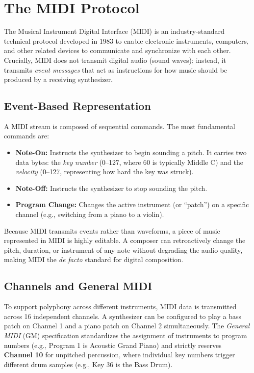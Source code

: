 \section{The MIDI Protocol}\label{sec:background-midi}

The Musical Instrument Digital Interface (MIDI) is an industry-standard technical protocol developed in 1983 to enable
electronic instruments, computers, and other related devices to communicate and synchronize with each other.
Crucially, MIDI does not transmit digital audio (sound waves); instead, it transmits \textit{event messages} that act as
instructions for how music should be produced by a receiving synthesizer.

\subsection{Event-Based Representation}\label{subsec:event-based-representation}

A MIDI stream is composed of sequential commands.
The most fundamental commands are:
\begin{itemize}
  \item \textbf{Note-On:} Instructs the synthesizer to begin sounding a pitch.
    It carries two data bytes: the \textit{key number} (0--127, where 60 is typically Middle C) and the
    \textit{velocity} (0--127, representing how hard the key was struck).
  \item \textbf{Note-Off:} Instructs the synthesizer to stop sounding the pitch.
  \item \textbf{Program Change:} Changes the active instrument (or ``patch'') on a specific channel (e.g., switching
    from a piano to a violin).
\end{itemize}

Because MIDI transmits events rather than waveforms, a piece of music represented in MIDI is highly editable.
A composer can retroactively change the pitch, duration, or instrument of any note without degrading the audio quality,
making MIDI the \textit{de facto} standard for digital composition.

\subsection{Channels and General MIDI}\label{subsec:channels-and-general-midi}

To support polyphony across different instruments, MIDI data is transmitted across 16 independent channels.
A synthesizer can be configured to play a bass patch on Channel 1 and a piano patch on Channel 2 simultaneously.
The \textit{General MIDI} (GM) specification standardizes the assignment of instruments to program numbers (e.g.,
Program 1 is Acoustic Grand Piano) and strictly reserves \textbf{Channel 10} for unpitched percussion, where individual
key numbers trigger different drum samples (e.g., Key 36 is the Bass Drum).

